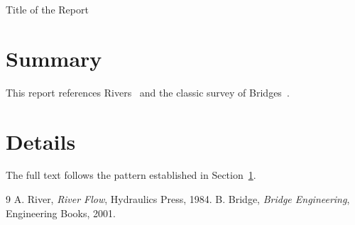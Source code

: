 \documentclass{article}
\begin{document}
Title of the Report
\section{Summary}\label{sec:summary}
This report references Rivers~\cite{river1984} and the classic
survey of Bridges~\cite{bridge2001}.
\section{Details}
The full text follows the pattern established in
Section~\ref{sec:summary}.

\begin{thebibliography}{9}
 A. River, \emph{River Flow}, Hydraulics Press, 1984.
 B. Bridge, \emph{Bridge Engineering}, Engineering Books, 2001.
\end{thebibliography}
\end{document}
